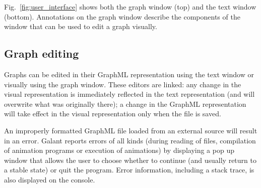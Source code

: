 Fig.~\ref{fig:user_interface} shows both the graph window (top) and the text
window (bottom). Annotations on the graph window describe the components of
the window that can be used to edit a graph visually.

\subsection{Graph editing}
\label{sec:graph_editing}

Graphs can be edited in their GraphML representation using the text window
or visually using the graph window.
These editors are linked:
any change in the visual representation is immediately reflected in the text
representation (and will overwrite what was originally there);
a change in the GraphML representation will take effect in the visual representation
only when the file is saved.

An improperly formatted GraphML file loaded from an external source will
result in an error.
Galant reports errors of all kinds (during reading of files, compilation of
animation programs or execution of animations)
by displaying a pop up window that allows the user to choose whether to
continue (and usually return to a stable state) or quit the program.
Error information, including a stack trace, is also displayed on the console.

